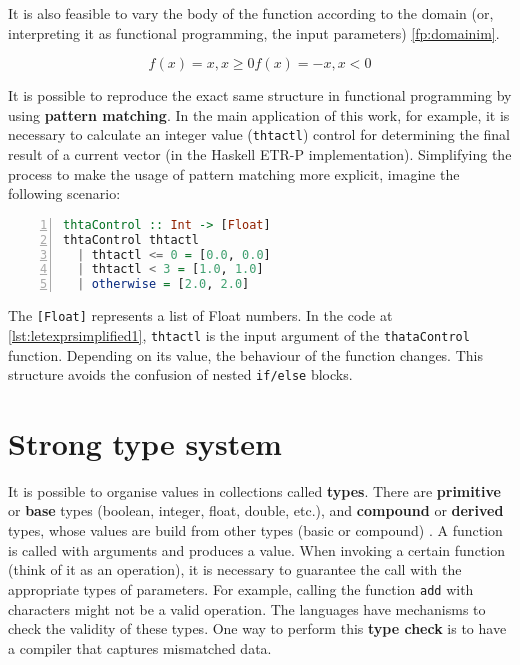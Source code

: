 It is also feasible to vary the body of the function according to the domain (or, interpreting it as functional programming, the input parameters) \ref{fp:domainim}.

\begin{subequations}\label{fp:domainim}
\begin{equation}
    f(x) = x, x \geq 0
\end{equation}
\begin{equation}
    f(x) = -x, x < 0
\end{equation}
\end{subequations}


It is possible to reproduce the exact same structure in functional programming by using \textbf{pattern matching}. In the main application of this work, for example, it is necessary to calculate an integer value (\lstinline!thtactl!) control for determining the final result of a current vector (in the Haskell ETR-P implementation). Simplifying the process to make the usage of pattern matching more explicit, imagine the following scenario:

\begin{lstlisting}[language=Haskell, numbers=left, caption={Pattern matching with guards. This does not correspond to the original implementation}, captionpos=b, label={lst:letexprsimplified1}]
thtaControl :: Int -> [Float]
thtaControl thtactl 
  | thtactl <= 0 = [0.0, 0.0]
  | thtactl < 3 = [1.0, 1.0]
  | otherwise = [2.0, 2.0]
\end{lstlisting}

The \lstinline![Float]! represents a list of Float numbers. In the code at \cref{lst:letexprsimplified1}, \lstinline!thtactl! is the input argument of the \lstinline!thataControl! function. Depending on its value, the behaviour of the function changes. This structure avoids the confusion of nested \lstinline!if/else! blocks.

\section{Strong type system}

It is possible to organise values in collections called \textbf{types}. There are \textbf{primitive} or \textbf{base} types (boolean, integer, float, double, etc.), and \textbf{compound} or \textbf{derived} types, whose values are build from other types (basic or compound) \cite{birdwadler}. A function is called with arguments and produces a value. When invoking a certain function (think of it as an operation), it is necessary to guarantee the call with the appropriate types of parameters. For example, calling the function \lstinline!add! with characters might not be a valid operation. The languages have mechanisms to check the validity of these types. One way to perform this \textbf{type check} is to have a compiler that captures mismatched data.

